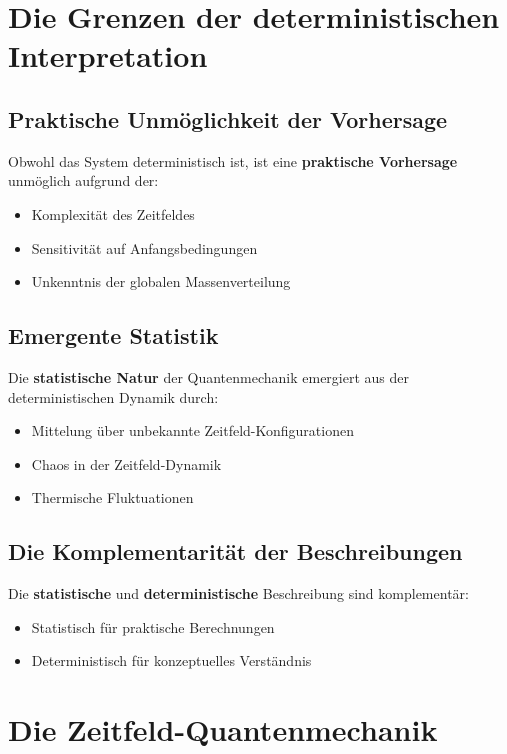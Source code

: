 \documentclass[12pt,a4paper]{report}
\begin{document}
	\section{Die Grenzen der deterministischen Interpretation}
	
	\subsection{Praktische Unmöglichkeit der Vorhersage}
	
	Obwohl das System deterministisch ist, ist eine \textbf{praktische Vorhersage} unmöglich aufgrund der:
	\begin{itemize}
		\item Komplexität des Zeitfeldes
		\item Sensitivität auf Anfangsbedingungen
		\item Unkenntnis der globalen Massenverteilung
	\end{itemize}
	
	\subsection{Emergente Statistik}
	
	Die \textbf{statistische Natur} der Quantenmechanik emergiert aus der deterministischen Dynamik durch:
	\begin{itemize}
		\item Mittelung über unbekannte Zeitfeld-Konfigurationen
		\item Chaos in der Zeitfeld-Dynamik
		\item Thermische Fluktuationen
	\end{itemize}
	
	\subsection{Die Komplementarität der Beschreibungen}
	
	Die \textbf{statistische} und \textbf{deterministische} Beschreibung sind komplementär:
	\begin{itemize}
		\item Statistisch für praktische Berechnungen
		\item Deterministisch für konzeptuelles Verständnis
	\end{itemize}
	
	\section{Die Zeitfeld-Quantenmechanik}
	
\end{document}
